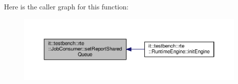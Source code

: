 Here is the caller graph for this function\-:
\nopagebreak
\begin{figure}[H]
\begin{center}
\leavevmode
\includegraphics[width=350pt]{dc/d6e/classit_1_1testbench_1_1rte_1_1JobConsumer_a9afd801517a4838a1dc301d531585fe9_icgraph}
\end{center}
\end{figure}




